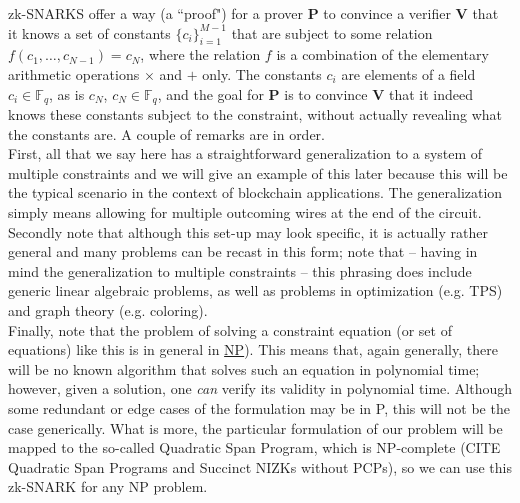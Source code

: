 \documentclass[11pt,oneside]{article}
\newcommand{\bP}{\textbf{P} }
\newcommand{\bV}{\textbf{V} }
\theoremstyle{definition}
\theoremstyle{remark}
\numberwithin{equation}{section}
\begin{document}
zk-SNARKS offer a way (a ``proof") for a prover \bP to convince a verifier \bV that it knows a set of constants $\{c_i\}_{i=1}^{M-1}$ that are subject to some relation $ f(c_1,\ldots,c_{N-1})=c_N $, where the relation $f$ is a combination of the elementary arithmetic operations $\times$ and $+$ only. The constants $c_i$ are elements of a field $c_i\in\mathbb{F}_q$, as is $c_N$, $c_N\in\mathbb{F}_{q}$, and the goal for \bP is to convince \bV that it indeed knows these constants subject to the constraint, without actually revealing what the constants are. A couple of remarks are in order.  \\ First, all that we say here has a straightforward generalization to a system of multiple constraints and we will give an example of this later because this will be the typical scenario in the context of blockchain applications. The generalization simply means allowing for multiple outcoming wires at the end of the circuit.\\
Secondly note that although this set-up may look specific, it is actually rather general and many problems can be recast in this form; note that -- having in mind the generalization to multiple constraints -- this phrasing does include generic linear algebraic problems, as well as problems in optimization (e.g. TPS) and graph theory (e.g. coloring).\\ 
Finally, note that the problem of solving a constraint equation (or set of equations) like this is in general in \hyperlink{box:np}{NP}). This means that, again generally, there will be no known algorithm that solves such an equation in polynomial time; however, given a solution, one \emph{can} verify its validity in polynomial time. Although some redundant or edge cases of the formulation may be in P, this will not be the case generically. What is more, the particular formulation of our problem will be mapped to the so-called Quadratic Span Program, which is NP-complete (CITE Quadratic Span Programs and Succinct NIZKs without PCPs), so we can use this zk-SNARK for any NP problem.
\newline
\end{document}

